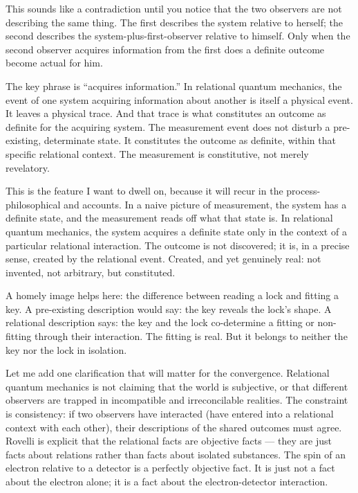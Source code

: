 This sounds like a contradiction until you notice that the two observers are not describing the same thing.
The first describes the system relative to herself; the second describes the system-plus-first-observer relative to himself.
Only when the second observer acquires information from the first does a definite outcome become actual for him.

The key phrase is ``acquires information.''
In relational quantum mechanics, the event of one system acquiring information about another is itself a physical event.
It leaves a physical trace.
And that trace is what constitutes an outcome as definite for the acquiring system.
The measurement event does not disturb a pre-existing, determinate state.
It constitutes the outcome as definite, within that specific relational context.
The measurement is constitutive, not merely revelatory.

This is the feature I want to dwell on, because it will recur in the process-philosophical and \bahai accounts.
In a naive picture of measurement, the system has a definite state, and the measurement reads off what that state is.
In relational quantum mechanics, the system acquires a definite state only in the context of a particular relational interaction.
The outcome is not discovered; it is, in a precise sense, created by the relational event.
Created, and yet genuinely real: not invented, not arbitrary, but constituted.

A homely image helps here: the difference between reading a lock and fitting a key.
A pre-existing description would say: the key reveals the lock's shape.
A relational description says: the key and the lock co-determine a fitting or non-fitting through their interaction.
The fitting is real.
But it belongs to neither the key nor the lock in isolation.

Let me add one clarification that will matter for the convergence.
Relational quantum mechanics is not claiming that the world is subjective, or that different observers are trapped in incompatible and irreconcilable realities.
The constraint is consistency: if two observers have interacted (have entered into a relational context with each other), their descriptions of the shared outcomes must agree.
Rovelli is explicit that the relational facts are objective facts --- they are just facts about relations rather than facts about isolated substances.
The spin of an electron relative to a detector is a perfectly objective fact.
It is just not a fact about the electron alone; it is a fact about the electron-detector interaction.

